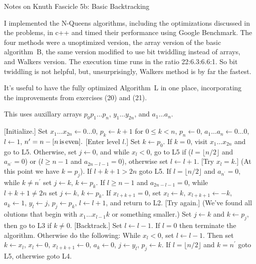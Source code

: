 \def\newstep#1{\smallskip \noindent {\bf #1}}
\def\newprob#1{\vskip 0.12in \noindent {\bf #1}}

\topglue 0.5in
\centerline{Notes on Knuth Fascicle 5b: Basic Backtracking}
\vskip 0.3in


I implemented the N-Queens algorithms, including the optimizations
discussed in the problems, in c++ and timed their performance using
Google Benchmark.  The four methods were a  unoptimized
version, the array version of the basic algorithm~B, the
same version modified to use bit twiddling instead of arrays,
and Walkers version.  The execution time runs in the ratio
22:6.3:6.6:1.  So bit twiddling is not helpful, but, unsurprisingly,
Walkers method is by far the fastest.

\vskip 0.1in

It's useful to have the fully optimized Algorithm~L in one place, incorporating
the improvements from exercises (20) and (21).

\noindent This uses auxillary arrays $p_0 p_1 \ldots p_n$, $y_1 \ldots y_{2n}$, and
$a_1 \ldots a_n$.

 [Initialize.] Set $x_1 \ldots x_{2 n} \leftarrow 0 \ldots 0$,
$p_k \leftarrow k + 1$ for $0 \leq k < n$, $p_n \leftarrow 0$, 
$a_{1} \ldots a_{n} \leftarrow 0 \ldots 0$, $l \leftarrow 1$,
$n^{\prime} = n - [n \rm{\, is\, even}].$
\vskip 0.05in
 [Enter level $l$.] Set $k \gets p_0$.  If $k = 0$, visit
$x_1 \ldots x_{2n}$ and go to L5.  Otherwise, set $j \leftarrow 0$, and
while $x_l < 0$, go to L5 if ($l = \lfloor n / 2 \rfloor$ and $a_{n^{\prime}} = 0$) 
or ($l \ge n - 1$ and $a_{2n - l - 1} = 0$), otherwise
set $l \leftarrow l + 1$.
\vskip 0.05in
 [Try $x_l = k$.] (At this point we have $k = p_j$).  If $l + k + 1 > 2n$
goto L5.  If $l = \lfloor n / 2 \rfloor$ and $a_{n^{\prime}} = 0$, while $k \ne n^{\prime}$
set $j \leftarrow k$, $k \leftarrow p_k$.  If $l \ge n - 1$ and $a_{2n - l - 1} = 0$, 
while $l + k + 1 \ne 2 n $ set $j \leftarrow k$, $k \leftarrow p_k$.  If $x_{l + k + 1} = 0$, 
set $x_l \leftarrow k$, $x_{l + k + 1} \leftarrow -k$,
$a_k \leftarrow 1$, $y_l \leftarrow j$, $p_j \leftarrow p_k$, $l \leftarrow l + 1$, and return to L2.
\vskip 0.05in
 [Try again.] (We've found all olutions that begin with $x_1 \ldots x_{l-1} k$
or something smaller.) Set $j \leftarrow k$ and $k \leftarrow p_j$, then go to L3 if $k \ne 0$.
\vskip 0.05in
 [Backtrack.] Set $l \leftarrow l - 1$.   If $l = 0$ then terminate the algorithm.
Otherwise do the following: While $x_l < 0$, set $l \leftarrow l - 1$.  Then set 
$k \leftarrow x_l$, $x_l \leftarrow 0$, $x_{l + k + 1} \leftarrow 0$, $a_k \leftarrow 0$, 
$j \leftarrow y_l$, $p_j \leftarrow k$.  If $l = \lfloor n / 2 \rfloor$ and $k = n^{\prime}$
goto L5, otherwise goto L4.

\bye